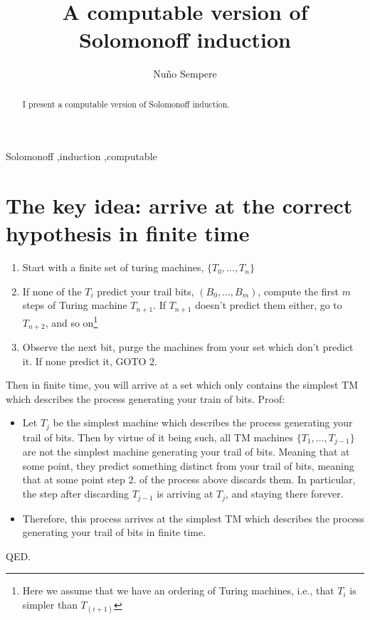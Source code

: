 \documentclass[12pt,authoryear]{elsarticle}
\begin{document}
\begin{frontmatter}


\title{A computable version of Solomonoff induction}


\author[1]{Nu\~{n}o Sempere}

\address[1]{Quantified Uncertainty Research Institute, Mexico}

\begin{abstract}
	I present a computable version of Solomonoff induction.
\end{abstract}

\begin{keyword}
Solomonoff \sep induction \sep computable
\end{keyword}

\end{frontmatter}

\section{The key idea: arrive at the correct hypothesis in finite time}

\begin{enumerate}
	\item Start with a finite set of turing machines, $\{T_0, ..., T_n\}$
	\item If none of the $T_i$ predict your trail bits, $(B_0, ..., B_m)$, compute the first $m$ steps of Turing machine $T_{n+1}$. If $T_{n+1}$ doesn't predict them either, go to $T_{n+2}$, and so on\footnote{Here we assume that we have an ordering of Turing machines, i.e., that $T_i$ is simpler than $T_{(i+1)}$}
	\item Observe the next bit, purge the machines from your set which don't predict it. If none predict it, GOTO 2.
\end{enumerate}


Then in finite time, you will arrive at a set which only contains the simplest TM which describes the process generating your train of bits. Proof:

\begin{itemize}
	\item Let $T_j$ be the simplest machine which describes the process generating your trail of bits. Then by virtue of it being such, all TM machines $\{T_1,...,T_{j-1}\}$ are not the simplest machine generating your trail of bits. Meaning that at some point, they predict something distinct from your trail of bits, meaning that at some point step 2. of the process above discards them. In particular, the step after discarding $T_{j-1}$ is arriving at $T_j$, and staying there forever.
  \item Therefore, this process arrives at the simplest TM which describes the process generating your trail of bits in finite time.
\end{itemize}
QED. 
\end{document}
